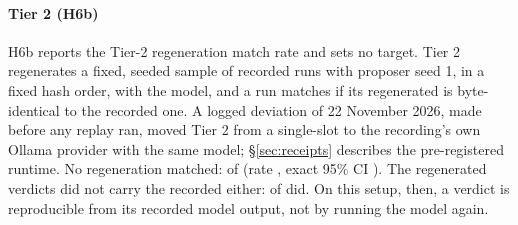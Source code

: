 \paragraph{Tier 2 (H6b)}
H6b reports the Tier-2 regeneration match rate and sets no target.
Tier 2 regenerates a fixed, seeded sample of  recorded  runs with proposer seed 1, in a fixed hash order, with the model, and a run matches if its regenerated  is byte-identical to the recorded one.
A logged deviation of 22 November 2026, made before any replay ran, moved Tier 2 from a single-slot  to the recording's own Ollama provider with the same model; \S\ref{sec:receipts} describes the pre-registered runtime.
No regeneration matched:  of  (rate , exact 95\% CI ).
The regenerated verdicts did not carry the recorded  either:  of  did.
On this setup, then, a verdict is reproducible from its recorded model output, not by running the model again.
